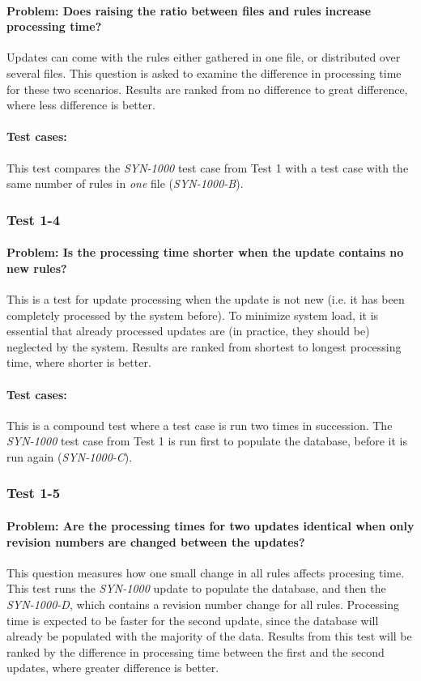 \paragraph{Problem: Does raising the ratio between files and rules increase
processing time?}
Updates can come with the rules either gathered in one file, or distributed over 
several files. This question is asked to examine the difference in processing
time for these two scenarios. Results are ranked from no difference to great
difference, where less difference is better.
\paragraph{Test cases:}
This test compares the \textit{SYN-1000} test case from Test 1 with a
test case with the same number of rules in \textit{one} file
(\textit{SYN-1000-B}).

\subsubsection{Test 1-4}
\paragraph{Problem: Is the processing time shorter when the update contains no
new rules?}
This is a test for update processing when the update is not new (i.e. it has
been completely processed by the system before). To minimize system load, it is
essential that already processed updates are (in practice, they should be)
neglected by the system.
Results are ranked from shortest to longest processing time, where shorter is better.
\paragraph{Test cases:}
This is a compound test where a test case is run two times in succession. The
\textit{SYN-1000} test case from Test 1 is run first to populate the database,
before it is run again (\textit{SYN-1000-C}).

\subsubsection{Test 1-5}
\paragraph{Problem: Are the processing times for two updates identical when
only revision numbers are changed between the updates?}
This question measures how one small change in all rules affects procesing time.
This test runs the \textit{SYN-1000} update to populate the database, and then
the \textit{SYN-1000-D}, which contains a revision number change for all rules.
Processing time is expected to be faster for the second update, since the
database will already be populated with the majority of the data. Results from
this test will be ranked by the difference in processing time between the first
and the second updates, where greater difference is better.


